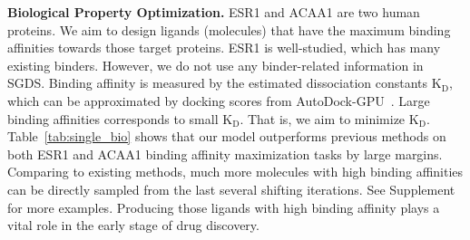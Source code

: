 \documentclass[accepted]{uai2023} %
\begin{document}
\textbf{Biological Property Optimization.} ESR1 and ACAA1 are two human proteins. We aim to design ligands (molecules) that have the maximum binding affinities towards those target proteins. ESR1 is well-studied, which has many existing binders. However, we do not use any binder-related information in SGDS. Binding affinity is measured by the estimated dissociation constants $\mathrm{K_D}$, which can be approximated by docking scores from AutoDock-GPU~\citep{santos2021accelerating}. Large binding affinities corresponds to small $\mathrm{K_D}$. That is, we aim to minimize $\mathrm{K_D}$.
Table~\ref{tab:single_bio} shows that our model outperforms previous methods on both ESR1 and ACAA1 binding affinity maximization tasks by  large margins. Comparing to existing methods, much more molecules with high binding affinities can be directly sampled from the last several shifting iterations. See Supplement for more examples. Producing those ligands with high binding affinity plays a vital role in the early stage of drug discovery. 
\end{document}
